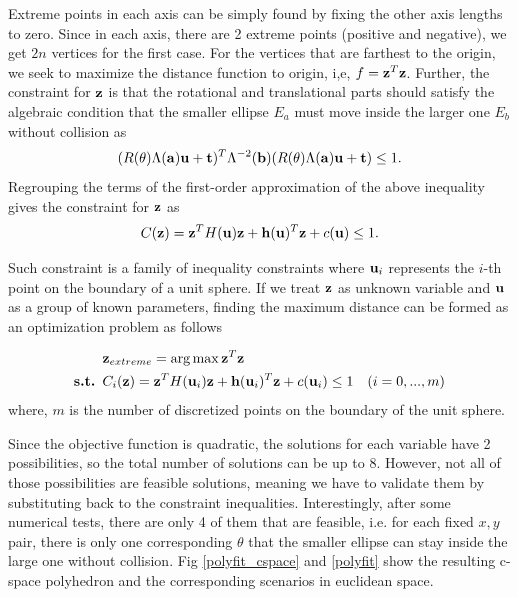\documentclass{article}
\begin{document}
Extreme points in each axis can be simply found by fixing the other axis lengths to zero. Since in each axis, there are 2 extreme points (positive and negative), we get $2n$ vertices for the first case. For the vertices that are farthest to the origin, we seek to maximize the distance function to origin, i,e, $f = {\bf z}^T {\bf z}$. Further, the constraint for ${\bf z}$ is that the rotational and translational parts should satisfy the algebraic condition that the smaller ellipse $E_a$ must move inside the larger one $E_b$ without collision as
\begin{equation}
(R(\theta) \Lambda({\bf a}) {\bf u} + {\bf t})^T \Lambda^{-2}({\bf b}) (R(\theta) \Lambda({\bf a}) {\bf u} + {\bf t}) \leq 1.
\end{equation}
Regrouping the terms of the first-order approximation of the above inequality gives the constraint for ${\bf z}$ as 
\begin{equation}
C({\bf z}) = {\bf z}^T H({\bf u}) {\bf z} + {\bf h}({\bf u})^T {\bf z} + c({\bf u}) \leq 1.
\end{equation}

Such constraint is a family of inequality constraints where ${\bf u}_i$ represents the $i$-th point on the boundary of a unit sphere. If we treat ${\bf z}$ as unknown variable and ${\bf u}$ as a group of known parameters, finding the maximum distance can be formed as an optimization problem as follows

\begin{equation}
\begin{aligned}
& {\bf z}_{extreme} = \arg\max {\bf z}^T {\bf z} \\
\text{{\bf s.t.   }} & C_i({\bf z}) = {\bf z}^T H({\bf u}_i) {\bf z} + {\bf h}({\bf u}_i)^T {\bf z} + c({\bf u}_i) \leq 1 & (i=0,...,m)\\
\end{aligned}
\end{equation}
where, $m$ is the number of discretized points on the boundary of the unit sphere.

Since the objective function is quadratic, the solutions for each variable have 2 possibilities, so the total number of solutions can be up to 8. However, not all of those possibilities are feasible solutions, meaning we have to validate them by substituting back to the constraint inequalities. Interestingly, after some numerical tests, there are only 4 of them that are feasible, i.e. for each fixed $x,y$ pair, there is only one corresponding $\theta$ that the smaller ellipse can stay inside the large one without collision. Fig \ref{polyfit_cspace} and \ref{polyfit} show the resulting c-space polyhedron and the corresponding scenarios in euclidean space.
\end{document}
